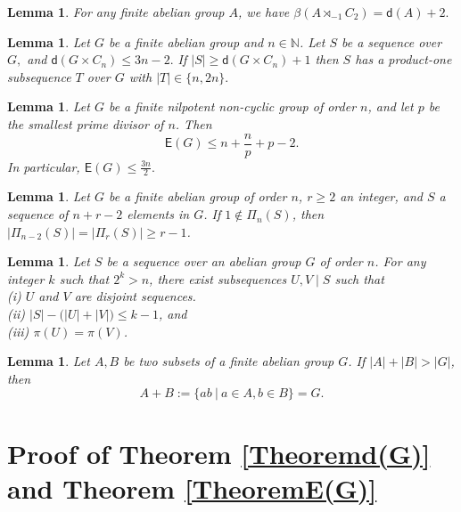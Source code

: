 \documentclass[a4paper,11pt]{article}
\numberwithin{equation}{section}
\newtheorem{lem}[thm]{Lemma}
\newcommand{\no}{\noindent}
\begin{document}
\begin{lem}\emph{\cite[Corollary 5.5]{CD2014}}\label{beta}
    For any finite abelian group $A$, we have $\beta (A \rtimes_{-1} C_2)= \mathsf{d}(A)+2.$
\end{lem}
 

\begin{lem}\emph{\cite[Proposition 5.7.7]{GerolHalt}}\label{n,2n}
    Let $G$ be a finite abelian group and $n\in \mathbb{N}$. Let $S$ be a sequence over $G,$ and $\mathsf{d}(G \times C_n)\le 3n-2.$ If $|S|\ge \mathsf{d}(G\times C_n)+1$ then $S$ has a product-one subsequence $T$ over $G$ with $|T|\in \{n,2n\}.$
\end{lem}

\begin{lem}\emph{\cite[Theorem 1.4]{HanD}}\label{Han}
    Let $G$ be a finite nilpotent non-cyclic group of order $n$, and let
$p$ be the smallest prime divisor of $n$. Then
$$\mathsf{E}(G) \le n +\frac{n}{p} + p -2.$$ In particular, $\mathsf{E}(G)\le \frac{3n}{2}.$
\end{lem}




\begin{lem}\emph{\cite[Lemma 7]{GaoLu2008}}\label{pi_n-2}
    Let $G$ be a finite abelian group of order $n$, $r \ge 2$ an integer, and $S$ a sequence of $n + r - 2$ elements in $G$. If $1 \notin \Pi_{n}(S)$, then $|\Pi_{n-2}(S)|=|\Pi_{r}(S)| \ge r-1$.
\end{lem}

\begin{lem}\emph{\cite[Lemma 7]{BAS2007}}\label{disjointsequences}
    Let $S$ be a sequence over an abelian group $G$ of order $n$. For any integer $k$ such that
$2^k >n$, there exist subsequences $U,V \mid S$ such that\\
\no \emph{(i)} $U$ and $V$ are disjoint sequences.\\
     \emph{(ii)} $|S| - \big(|U| + |V|\big) \le k - 1$, and\\
     \emph{(iii)} $\pi(U)=\pi(V)$.

\end{lem}

\begin{lem}\emph{\cite[Lemma 2.2]{Nathanson1996}}\label{Nathanson}
    Let $A, B$ be two subsets of a finite abelian group $G$. If $|A| + |B| > |G|$, then $$A + B:=\{ab ~|~a \in A, b \in B\} = G.$$
\end{lem}

\section{Proof of Theorem \ref{Theoremd(G)} and Theorem \ref{TheoremE(G)}}\label{SectionTheoremproof1.11.3}
\end{document}
